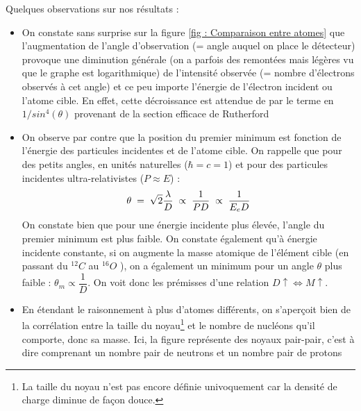 Quelques observations sur nos résultats :
\begin{itemize}[label=$\bullet$]
    \item On constate sans surprise sur la figure \eqref{fig : Comparaison entre atomes} que l'augmentation de l'angle d'observation (= angle auquel on place le détecteur) provoque une diminution générale (on a parfois des remontées mais légères vu que le graphe est logarithmique) de l'intensité observée (= nombre d'électrons observés à cet angle) et ce peu importe l'énergie de l'électron incident ou l'atome cible. En effet, cette décroissance est attendue de par le terme en  $1/sin^4(\theta)$ provenant de la section efficace de Rutherford

    \item On observe par contre que la position du premier minimum est fonction de l'énergie des particules incidentes et de l'atome cible. On rappelle que pour des petits angles, en unités naturelles ($\hbar = c = 1$) et pour des particules incidentes ultra-relativistes ($P \approx E$) :
    \begin{equation*}
        \theta \; = \; \sqrt{2} \dfrac{\lambda}{D} \; \propto \; \dfrac{1}{P D} \; \propto \; \dfrac{1}{E_e D}
    \end{equation*}
    On constate bien que pour une énergie incidente plus élevée, l'angle du premier minimum est plus faible. On constate également qu'à énergie incidente constante, si on augmente la masse atomique de l'élément cible (en passant du $^{12}C$ au $^{16}O$ ), on a également un minimum pour un angle $\theta$ plus faible : $\theta_m \propto \dfrac{1}{D}$. On voit donc les prémisses d'une relation $D\uparrow \Leftrightarrow M\uparrow$.\\
    \item En étendant le raisonnement à plus d'atomes différents, on s'aperçoit bien de la corrélation entre la taille du noyau\footnote{La taille du noyau n'est pas encore définie univoquement car la densité de charge diminue de façon douce.} et le nombre de nucléons qu'il comporte, donc sa masse. Ici, la figure représente des noyaux pair-pair, c'est à dire comprenant un nombre pair de neutrons et un nombre pair de protons
     \begin{figure}[H]
        \centering

\end{figure}
\end{itemize}

